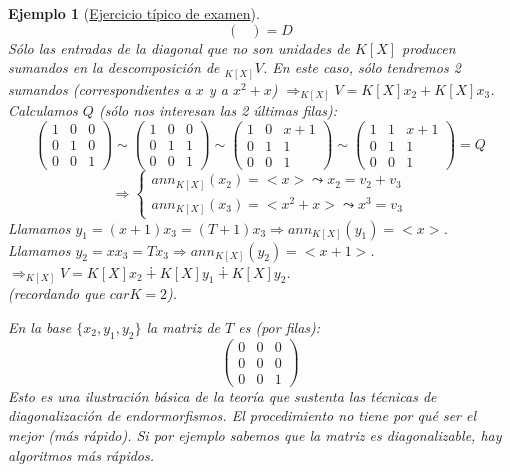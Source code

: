 \documentclass[11pt,a4paper]{article}
\theoremstyle{break}
\newtheorem{example}[theorem]{Ejemplo}
\begin{document}
\begin{example}[\underline{Ejercicio típico de examen}]
$$\begin{pmatrix}
\end{pmatrix} = D$$
Sólo las entradas de la diagonal que no son unidades de $K[X]$ producen sumandos en la descomposición de $_{K[X]}V$. En este caso, sólo tendremos 2 sumandos (correspondientes a $x$ y a $x^{2}+x$) $\Rightarrow _{K[X]}V = K[X]x_{2} + K[X]x_{3}$. \\
Calculamos $Q$ (sólo nos interesan las 2 últimas filas):
$$\begin{pmatrix}
1 & 0 & 0 \\
0 & 1 & 0 \\
0 & 0 & 1
\end{pmatrix} \sim \begin{pmatrix}
1 & 0 & 0 \\
0 & 1 & 1 \\
0 & 0 & 1
\end{pmatrix} \sim \begin{pmatrix}
1 & 0 & x+1 \\
0 & 1 & 1 \\
0 & 0 & 1
\end{pmatrix} \sim \begin{pmatrix}
1 & 1 & x+1 \\
0 & 1 & 1 \\
0 & 0 & 1
\end{pmatrix} = Q$$
$$\Rightarrow \begin{cases}
ann_{K[X]}(x_{2}) = <x> \leadsto x_{2} = v_{2} + v_{3} \\
ann_{K[X]}(x_{3}) = <x^{2}+x> \leadsto x^{3} = v_{3}
\end{cases}$$
Llamamos $y_{1} = (x+1)x_{3} = (T+1)x_{3} \Rightarrow ann_{K[X]}(y_{1}) = <x>$. \\
Llamamos $y_{2} = xx_{3} = Tx_{3} \Rightarrow ann_{K[X]}(y_{2}) = <x+1>$. \\
$\Rightarrow _{K[X]}V = K[X]x_{2} \dotplus K[X]y_{1} \dotplus K[X]y_{2}$. \\
(recordando que $carK = 2$).

En la base $\{x_{2}, y_{1}, y_{2}\}$ la matriz de $T$ es (por filas):
$$\begin{pmatrix}
0 & 0 & 0 \\
0 & 0 & 0 \\
0 & 0 & 1
\end{pmatrix}$$
Esto es una ilustración básica de la teoría que sustenta las técnicas de diagonalización de endormorfismos. El procedimiento no tiene por qué ser el mejor (más rápido). Si por ejemplo sabemos que la matriz es diagonalizable, hay algoritmos más rápidos.
\end{example}
\end{document}
